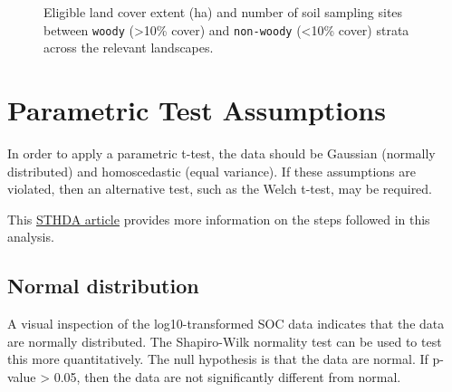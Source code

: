 \documentclass[
  letterpaper,
  DIV=11,
  numbers=noendperiod]{scrartcl}
\begin{document}
\begin{figure}


\caption{\label{fig-sanlc-woody}Eligible land cover extent (ha) and
number of soil sampling sites between \texttt{woody} (\textgreater10\%
cover) and \texttt{non-woody} (\textless10\% cover) strata across the
relevant landscapes.}

\end{figure}%

\section{Parametric Test Assumptions}\label{parametric-test-assumptions}

In order to apply a parametric t-test, the data should be Gaussian
(normally distributed) and homoscedastic (equal variance). If these
assumptions are violated, then an alternative test, such as the Welch
t-test, may be required.

This
\href{http://www.sthda.com/english/wiki/unpaired-two-samples-t-test-in-r}{STHDA
article} provides more information on the steps followed in this
analysis.

\subsection{Normal distribution}\label{normal-distribution}

A visual inspection of the log10-transformed SOC data indicates that the
data are normally distributed. The Shapiro-Wilk normality test can be
used to test this more quantitatively. The null hypothesis is that the
data are normal. If p-value \textgreater{} 0.05, then the data are not
significantly different from normal.
\end{document}
